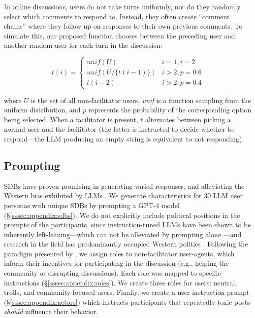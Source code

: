 In online discussions, users do not take turns uniformly, nor do they randomly select which comments to respond to. Instead, they often create ``comment chains'' where they follow up on responses to their own previous comments. To simulate this, our proposed function chooses between the preceding user and another random user for each turn in the discussion:

\small
\begin{equation}
\label{eq:turn_taking}
    t(i) = \left\{
\begin{array}{ll}
    \textit{unif}(U) & i=1, i=2\\
    \textit{unif}(U/\{t(i-1)\}) & i > 2, p=0.6 \\
    t(i-2) & i > 2, p=0.4 
\end{array} 
\right.
\end{equation}
\normalsize

\noindent where $U$ is the set of all non-facilitator users, \textit{unif} is a function sampling from the uniform distribution, and $p$ represents the probability of the corresponding option being selected. When a facilitator is present, $t$ alternates between picking a normal user and the facilitator (the latter is instructed to decide whether to respond---the \ac{LLM} producing an empty string is equivalent to not responding).


\subsection{Prompting}
\label{ssec:methodology:prompts}

\acfp{SDB} have proven promising in generating varied responses, and alleviating the Western bias exhibited by \acp{LLM} \cite{burton2024large}. We generate characteristics for 30 \ac{LLM} user personas with unique \acp{SDB} by prompting a GPT-4 model \cite{openai2024gpt4technicalreport} (\S\ref{sssec:appendix:sdbs}). We do not explicitly include political positions in the prompts of the participants, since instruction-tuned \acp{LLM} have been shown to be inherently left-leaning---which can not be alleviated by prompting alone \cite{Taubenfeld2024SystematicBI}---and research in the field has predominantly occupied Western politics \cite{Taubenfeld2024SystematicBI, potter-etal-2024-hidden, political_2024, pit2024oninvestigatingpoliticalstance}. 
Following the paradigm presented by \citet{abdelnabi_negotiations}, we assign roles to non-facilitator user-agents, which inform their incentives for participating in the discussion (e.g., helping the community or disrupting discussions). Each role was mapped to specific instructions (\S\ref{sssec:appendix:roles}). We create three roles for users: neutral, trolls, and community-focused users.                                      
 Finally, we create a user instruction prompt (\S\ref{sssec:appendix:actors}) which instructs participants that repeatedly toxic posts \emph{should} influence their behavior. 